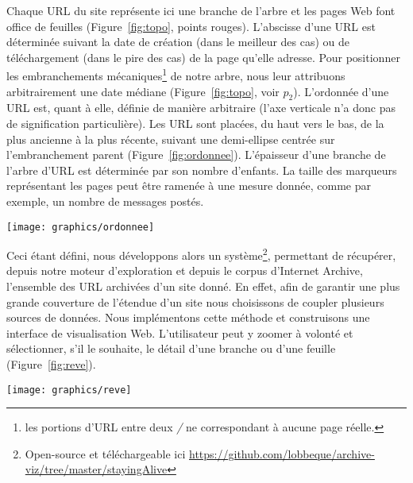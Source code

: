 \documentclass[symmetric,justified,marginals=raggedouter]{tufte-book}
\begin{document}
\noindent Chaque URL du site représente ici une branche de l'arbre et les pages Web font office de feuilles (Figure~\ref{fig:topo}, points rouges). L'abscisse d'une URL est déterminée suivant la date de création (dans le meilleur des cas) ou de téléchargement (dans le pire des cas) de la page qu'elle adresse. Pour positionner les embranchements mécaniques\footnote{\RaggedOuter les portions d'URL entre deux \textit{/} ne correspondant à aucune page réelle.} de notre arbre, nous leur attribuons arbitrairement une date médiane (Figure~\ref{fig:topo}, voir $p_2$). L'ordonnée d'une URL est, quant à elle, définie de manière arbitraire (l'axe verticale n'a donc pas de signification particulière). Les URL sont placées, du haut vers le bas, de la plus ancienne à la plus récente, suivant une demi-ellipse centrée sur l'embranchement parent (Figure~\ref{fig:ordonnee}). L'épaisseur d'une branche de l'arbre d'URL est déterminée par son nombre d'enfants. La taille des marqueurs représentant les pages peut être ramenée à une mesure donnée, comme par exemple, un nombre de messages postés.

\begin{marginfigure}%
  \texttt{[image: graphics/ordonnee]}
  \vspace*{0.2cm}  
  \caption{Positionnement de 3 pages (rouge) autour d'un embranchement parent (bleu)}
  \label{fig:ordonnee}
\end{marginfigure} 

Ceci étant défini, nous développons alors un système\footnote{\RaggedOuter Open-source et téléchargeable ici \url{https://github.com/lobbeque/archive-viz/tree/master/stayingAlive}}, permettant de récupérer, depuis notre moteur d'exploration et depuis le corpus d'Internet Archive, l'ensemble des URL archivées d'un site donné. En effet, afin de garantir une plus grande couverture de l'étendue d'un site nous choisissons de coupler plusieurs sources de données. Nous implémentons cette méthode et construisons une interface de visualisation Web. L'utilisateur peut y zoomer à volonté et sélectionner, s'il le souhaite, le détail d'une branche ou d'une feuille (Figure~\ref{fig:reve}).\\

\begin{figure*}
  \texttt{[image: graphics/reve]}
  \caption{Capture d'écran de l'évolution topologique de la section \textit{Interprétation des rêves, roqya, djinn} du forum de \textit{yabiladi.com}}
  \label{fig:reve}
\end{figure*}
\end{document}
